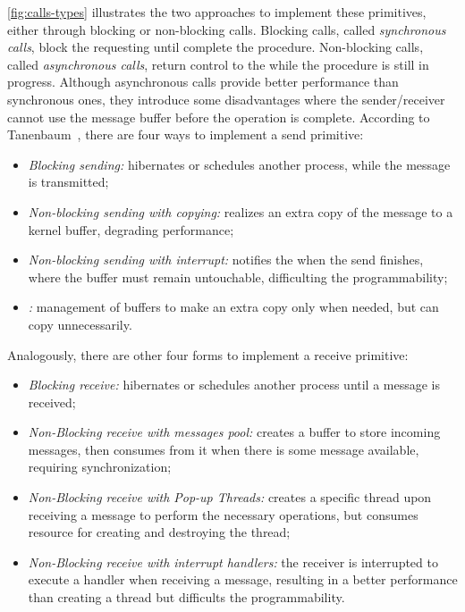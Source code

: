 				\autoref{fig:calls-types} illustrates the two approaches to implement
				these primitives, either through blocking or non-blocking calls.
				Blocking calls, called \textit{synchronous calls}, block the requesting \cpu
				until complete the procedure.
				Non-blocking calls, called \textit{asynchronous calls}, return control to the
				\cpu while the procedure is still in progress.
				Although asynchronous calls provide better performance than
				synchronous ones, they introduce some disadvantages where the sender/receiver
				cannot use the message buffer before the operation is complete.
				According to Tanenbaum~\cite{tanenbaum:4ed}, there are four ways to implement
				a send primitive:
				\begin{itemize}
					\item \textit{Blocking sending:} \cpu hibernates or schedules another
						process, while the message is transmitted;
					\item \textit{Non-blocking sending with copying:} realizes an extra copy of
						the message to a kernel buffer, degrading performance;
					\item \textit{Non-blocking sending with interrupt:} notifies the \cpu
						when the send finishes, where the buffer must remain untouchable,
						difficulting the programmability;
					\item \textit{\cow:} management of buffers to make an extra copy only
						when needed, but can copy unnecessarily.
				\end{itemize}

				Analogously, there are other four forms to implement a receive primitive:
				\begin{itemize}
					\item \textit{Blocking receive:} \cpu hibernates or schedules another
						process until a message is received;
					\item \textit{Non-Blocking receive with messages pool:} \cpu creates
						a buffer to store incoming messages, then consumes from it when
						there is some message available, requiring synchronization;
					\item \textit{Non-Blocking receive with Pop-up Threads:} creates a specific
						thread upon receiving a message to perform the necessary operations,
						but consumes resource for creating and destroying the thread;
					\item \textit{Non-Blocking receive with interrupt handlers:} the receiver
						is interrupted to execute a handler when receiving a message, resulting
						in a better performance than creating a thread but difficults
						the programmability.
				\end{itemize}

